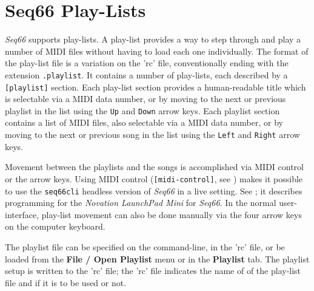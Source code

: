 %
%
%

\section{Seq66 Play-Lists}
\label{sec:playlist}

   \textsl{Seq66} supports play-lists.
   A play-list provides a way to step through and
   play a number of MIDI files without
   having to load each one individually.
   The format of the play-list file is a variation on the 'rc' file,
   conventionally ending with the extension \texttt{.playlist}.
   It contains a number of play-lists, each described by a
   \texttt{[playlist]} section.
   Each play-list section provides
   a human-readable title which is selectable via a MIDI data number,
   or by moving to the next or previous playlist in the list using the
   \texttt{Up} and \texttt{Down} arrow keys.
   Each playlist section contains a list of MIDI files, also selectable via a
   MIDI data number, or by moving to the next or previous song in the list
   using the \texttt{Left} and \texttt{Right} arrow keys.

   Movement between the playlists and the songs is accomplished via 
   MIDI control or the arrow keys.
   Using MIDI control (\texttt{[midi-control]}, see
   )
   makes it possible to use the \texttt{seq66cli}
   headless version of \textsl{Seq66} in a live setting.
   See ; it describes
   programming for the \textsl{Novation LaunchPad Mini} for
   \textsl{Seq66}.
   In the normal user-interface, play-list movement
   can also be done manually via the four arrow keys on the computer
   keyboard.

   The playlist file can be specified on the command-line, in
   the 'rc' file, or be loaded
   from the \textbf{File / Open Playlist} menu or in
   the \textbf{Playlist} tab.
   The playlist setup is written to the 'rc' file; the 'rc' file
   indicates the name of of the play-list file and if it is to be used
   or not.

